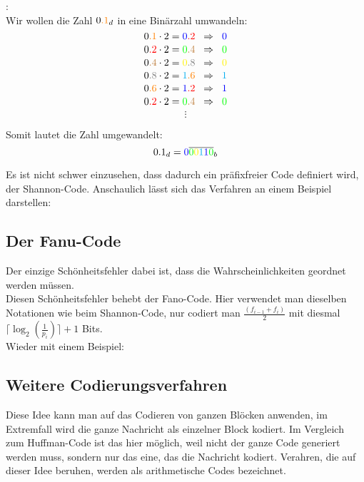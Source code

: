 \begin{bsp}:\\
    Wir wollen die Zahl $0{\color{orange}.1}_d$ in eine Binärzahl umwandeln:
    \[0{\color{orange}.1}\cdot 2={\color{blue}0}{\color{red}.2}\;\;\Rightarrow\;\;{\color{blue}0}\]
    \[0{\color{red}.2}\cdot 2={\color{green}0}{\color{brown}.4}\;\;\Rightarrow\;\;{\color{green}0}\]
    \[0{\color{brown}.4}\cdot 2={\color{yellow}0}{\color{gray}.8}\;\;\Rightarrow\;\;{\color{yellow}0}\]
    \[0{\color{gray}.8}\cdot 2={\color{cyan}1}{\color{orange}.6}\;\;\Rightarrow\;\;{\color{cyan}1}\]
    \[0{\color{orange}.6}\cdot 2={\color{blue}1}{\color{red}.2}\;\;\Rightarrow\;\;{\color{blue}1}\]
    \[0{\color{red}.2}\cdot 2={\color{green}0}{\color{brown}.4}\;\;\Rightarrow\;\;{\color{green}0}\]
    \[\vdots\]

Somit lautet die Zahl umgewandelt:
\[0.1_d={\color{blue}0}\overline{{\color{green}0}{\color{yellow}0}{\color{cyan}1}{\color{blue}1}{\color{green}0}}_b
\]
\end{bsp}

Es ist nicht schwer
einzusehen, dass dadurch ein präfixfreier Code definiert wird, der
Shannon-Code. 
Anschaulich lässt sich das Verfahren an einem Beispiel darstellen:

\subsection{Der Fanu-Code}
Der einzige Schönheitsfehler dabei ist, dass die Wahrscheinlichkeiten geordnet werden müssen. \\
Diesen Schönheitsfehler behebt der 
Fano-Code.
Hier verwendet man dieselben Notationen wie beim Shannon-Code,
nur codiert man
$\frac{(f_{i-1}+f_i)}{2}$ mit diesmal $\lceil \log_2(\frac{1}{p_i})\rceil+1$ Bits.\\
Wieder mit einem Beispiel:\\

\subsection{Weitere Codierungsverfahren}
Diese Idee kann man auf das Codieren von ganzen Blöcken anwenden, im
Extremfall wird die ganze Nachricht als einzelner Block kodiert. Im 
Vergleich zum Huffman-Code ist das hier möglich, weil nicht der ganze
Code generiert werden muss, sondern nur das eine, das die Nachricht kodiert.
Verahren, die auf dieser Idee beruhen, werden als arithmetische
Codes bezeichnet.

